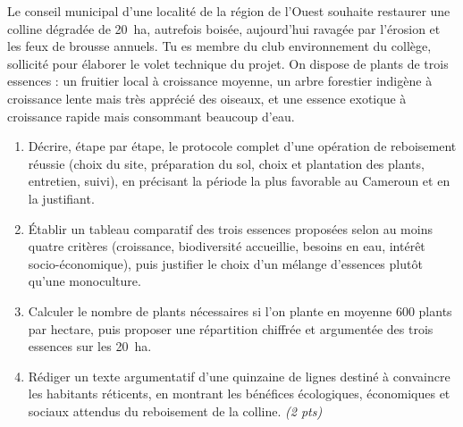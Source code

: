 \documentclass[11pt]{article}
\begin{document}
\begin{exercice}
Le conseil municipal d'une localité de la région de l'Ouest souhaite restaurer une colline dégradée de \SI{20}{\hectare}, autrefois boisée, aujourd'hui ravagée par l'érosion et les feux de brousse annuels. Tu es membre du club environnement du collège, sollicité pour élaborer le volet technique du projet. On dispose de plants de trois essences : un fruitier local à croissance moyenne, un arbre forestier indigène à croissance lente mais très apprécié des oiseaux, et une essence exotique à croissance rapide mais consommant beaucoup d'eau.

\begin{enumerate}
\item Décrire, étape par étape, le protocole complet d'une opération de reboisement réussie (choix du site, préparation du sol, choix et plantation des plants, entretien, suivi), en précisant la période la plus favorable au Cameroun et en la justifiant.
\item Établir un tableau comparatif des trois essences proposées selon au moins quatre critères (croissance, biodiversité accueillie, besoins en eau, intérêt socio-économique), puis justifier le choix d'un mélange d'essences plutôt qu'une monoculture.
\item Calculer le nombre de plants nécessaires si l'on plante en moyenne 600 plants par hectare, puis proposer une répartition chiffrée et argumentée des trois essences sur les \SI{20}{\hectare}.
\item Rédiger un texte argumentatif d'une quinzaine de lignes destiné à convaincre les habitants réticents, en montrant les bénéfices écologiques, économiques et sociaux attendus du reboisement de la colline. \textit{(2 pts)}
\end{enumerate}
\end{exercice}
\end{document}
